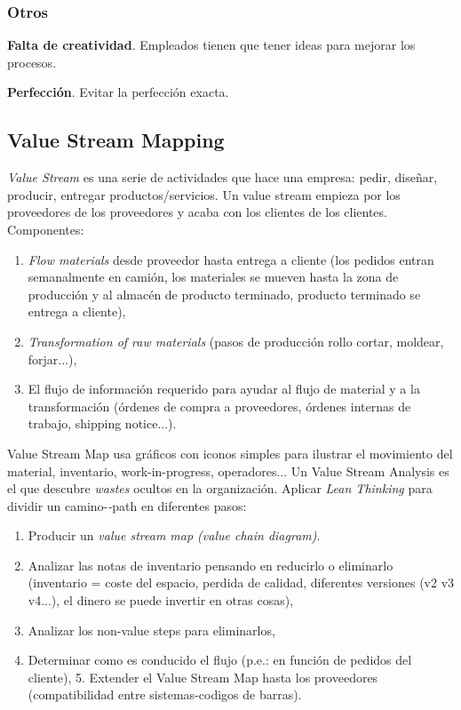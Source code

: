 \documentclass[]{article}
\begin{document}
\subsubsection{Otros}

\textbf{Falta de creatividad}. Empleados tienen que tener ideas para mejorar los procesos.

\textbf{Perfección}. Evitar la perfección exacta. 

\subsection{Value Stream Mapping} 

\textit{Value Stream} es una serie de actividades que hace una empresa: pedir, diseñar, producir, entregar productos/servicios. Un value stream empieza por los proveedores de los proveedores y acaba con los clientes de los clientes. Componentes: \begin{enumerate} \item \textit{Flow materials} desde proveedor hasta entrega a cliente (los pedidos entran semanalmente en camión, los materiales se mueven hasta la zona de producción y al almacén de producto terminado, producto terminado se entrega a cliente), \item \textit{Transformation of raw materials} (pasos de producción rollo cortar, moldear, forjar...), \item El flujo de información requerido para ayudar al flujo de material y a la transformación (órdenes de compra a proveedores, órdenes internas de trabajo, shipping notice...). \end{enumerate}

Value Stream Map usa gráficos con iconos simples para ilustrar el movimiento del material, inventario, work-in-progress, operadores... Un Value Stream Analysis es el que descubre \textit{wastes} ocultos en la organización. Aplicar \textit{Lean Thinking} para dividir un camino-\textit-{path} en diferentes pasos: \begin{enumerate} \item Producir un \textit{value stream map (value chain diagram)}. \item Analizar las notas de inventario pensando en reducirlo o eliminarlo (inventario = coste del espacio, perdida de calidad, diferentes versiones (v2 v3 v4...), el dinero se puede invertir en otras cosas), \item Analizar los non-value steps para eliminarlos, \item Determinar como es conducido el flujo (p.e.: en función de pedidos del cliente), 5. Extender el Value Stream Map hasta los proveedores (compatibilidad entre sistemas-codigos de barras). \end{enumerate}
\end{document}
